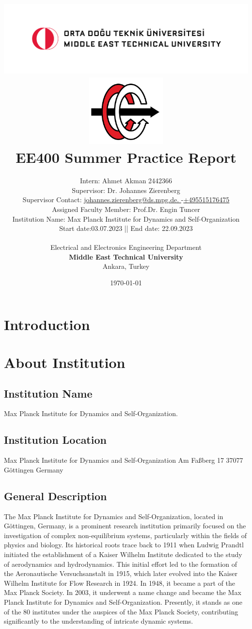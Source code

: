 \documentclass[a4paper,12pt]{article}
\title{
\includegraphics[width=17cm]{odtu.png} \\
\includegraphics[width=4cm]{eee.png} \\
\vspace*{0.5in}
\textbf{EE400 Summer Practice Report}
\vspace*{0.25in}
}
\author{Intern: Ahmet Akman 2442366\\
Supervisor: Dr. Johannes Zierenberg\\
Supervisor Contact: \href{mailto: johannes.zierenberg@ds.mpg.de}{ johannes.zierenberg@ds.mpg.de. }-\href{tel:+495515176475}{+495515176475}\\
Assigned Faculty Member: Prof.Dr. Engin Tuncer\\
Institution Name: Max Planck Institute for Dynamics and Self-Organization\\
Start date:03.07.2023 || End date: 22.09.2023\\
        \vspace*{0.25in} \\
        Electrical and Electronics Engineering Department\\
        \textbf{Middle East Technical University}\\
        Ankara, Turkey
       } \date{\today}
\begin{document}


%


\maketitle

\newpage
\tableofcontents
\newpage
\section{Introduction}
\section{About Institution}
\subsection{Institution Name}
Max Planck Institute for Dynamics and Self-Organization.
\subsection{Institution Location}
Max Planck Institute for Dynamics and Self-Organization
Am Faßberg 17
37077 Göttingen
Germany
\subsection{General Description}
The Max Planck Institute for Dynamics and Self-Organization, located in Göttingen, Germany, is a prominent research institution primarily focused on the investigation of complex non-equilibrium systems, particularly within the fields of physics and biology. Its historical roots trace back to 1911 when Ludwig Prandtl initiated the establishment of a Kaiser Wilhelm Institute dedicated to the study of aerodynamics and hydrodynamics. This initial effort led to the formation of the Aeronautische Versuchsanstalt in 1915, which later evolved into the Kaiser Wilhelm Institute for Flow Research in 1924. In 1948, it became a part of the Max Planck Society. In 2003, it underwent a name change and became the Max Planck Institute for Dynamics and Self-Organization. Presently, it stands as one of the 80 institutes under the auspices of the Max Planck Society, contributing significantly to the understanding of intricate dynamic systems.
\end{document}
